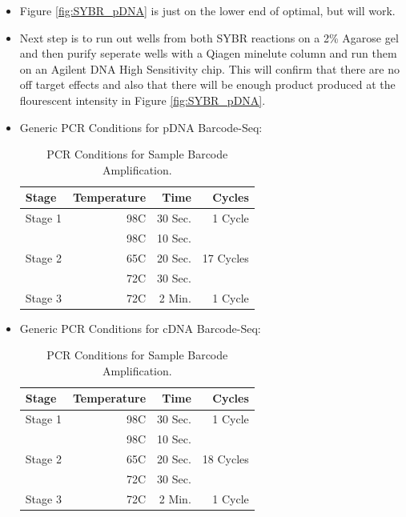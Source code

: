 \documentclass[a4paper]{article}
\begin{document}
        \begin{itemize}
        
        	\item Figure \ref{fig:SYBR_pDNA} is just on the lower end of optimal, but will work. 
        	
            \item Next step is to run out wells from both SYBR reactions on a 2\% Agarose gel and then purify seperate wells with a Qiagen minelute column and run them on an Agilent DNA High Sensitivity chip. This will confirm that there are no off target effects and also that there will be enough product produced at the flourescent intensity in Figure \ref{fig:SYBR_pDNA}.
        
        \item Generic PCR Conditions for pDNA Barcode-Seq:
        
        \FloatBarrier
            \begin{table}[H]
				\centering
				\begin{tabular}{l|r|r|r}
					Stage 	& 	Temperature	&	Time	&	Cycles		\\\hline
					Stage 1	&	98C			&	30 Sec.	&	1 Cycle		\\\hline
							&	98C			&	10 Sec.	&				\\
                    Stage 2	&	65C			&	20 Sec.	&	17 Cycles	\\
                    		&	72C			&	30 Sec.	&				\\\hline
                    Stage 3	&	72C			&	2 Min.	&	1 Cycle		\\
				\end{tabular}
           		\caption{\label{BC_PCR}PCR Conditions for Sample Barcode Amplification.}
           \end{table}
           
           \item Generic PCR Conditions for cDNA Barcode-Seq:
        
        \FloatBarrier
            \begin{table}[H]
				\centering
				\begin{tabular}{l|r|r|r}
					Stage 	& 	Temperature	&	Time	&	Cycles		\\\hline
					Stage 1	&	98C			&	30 Sec.	&	1 Cycle		\\\hline
							&	98C			&	10 Sec.	&				\\
                    Stage 2	&	65C			&	20 Sec.	&	18 Cycles	\\
                    		&	72C			&	30 Sec.	&				\\\hline
                    Stage 3	&	72C			&	2 Min.	&	1 Cycle		\\
				\end{tabular}
           		\caption{\label{BC_PCR}PCR Conditions for Sample Barcode Amplification.}
           \end{table}
           
	\end{itemize}
        
\end{document}
